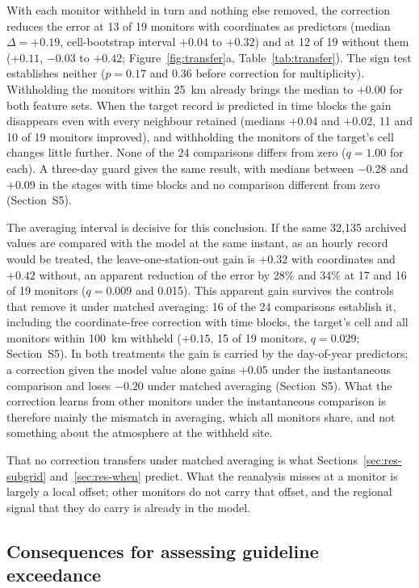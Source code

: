 With each monitor withheld in turn and nothing else removed, the correction reduces the error at
13 of 19 monitors with coordinates as predictors (median $\Delta=+0.19$, cell-bootstrap interval
$+0.04$ to $+0.32$) and at 12 of 19 without them ($+0.11$, $-0.03$ to $+0.42$;
Figure~\ref{fig:transfer}a, Table~\ref{tab:transfer}). The sign test establishes neither
($p=0.17$ and 0.36 before correction for multiplicity). Withholding the monitors within 25~km
already brings the median to $+0.00$ for both feature sets. When the target record is predicted
in time blocks the gain disappears even with every neighbour retained (medians $+0.04$ and
$+0.02$, 11 and 10 of 19 monitors improved), and withholding the monitors of the target's cell
changes little further. None of the 24 comparisons differs from zero ($q=1.00$ for each). A
three-day guard gives the same result, with medians between $-0.28$ and $+0.09$ in the stages
with time blocks and no comparison different from zero (Section~S5).

The averaging interval is decisive for this conclusion. If the same 32,135 archived values are
compared with the model at the same instant, as an hourly record would be treated, the
leave-one-station-out gain is $+0.32$ with coordinates and $+0.42$ without, an apparent reduction
of the error by 28\% and 34\% at 17 and 16 of 19 monitors ($q=0.009$ and 0.015). This apparent
gain survives the controls that remove it under matched averaging: 16 of the 24 comparisons
establish it, including the coordinate-free correction with time blocks, the target's cell and
all monitors within 100~km withheld ($+0.15$, 15 of 19 monitors, $q=0.029$; Section~S5). In both
treatments the gain is carried by the day-of-year predictors; a correction given the model value
alone gains $+0.05$ under the instantaneous comparison and loses $-0.20$ under matched averaging
(Section~S5). What the correction learns from other monitors under the instantaneous comparison
is therefore mainly the mismatch in averaging, which all monitors share, and not something about
the atmosphere at the withheld site.

That no correction transfers under matched averaging is what Sections~\ref{sec:res-subgrid}
and~\ref{sec:res-when} predict. What the reanalysis misses at a monitor is largely a local offset;
other monitors do not carry that offset, and the regional signal that they do carry is already
in the model.

\subsection{Consequences for assessing guideline exceedance}
\label{sec:res-exceed}

